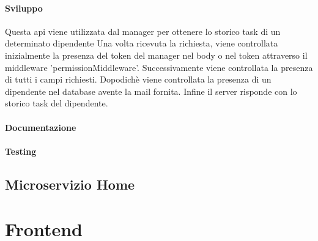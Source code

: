 \documentclass{report}
\begin{document}
		\subsubsection*{Sviluppo}
		Questa api viene utilizzata dal manager per ottenere lo storico task di un determinato dipendente
		Una volta ricevuta la richiesta, viene controllata inizialmente la presenza del token del manager nel body o nel token attraverso il middleware 'permissionMiddleware'.
		Successivamente viene controllata la presenza di tutti i campi richiesti.
		Dopodichè viene controllata la presenza di un dipendente nel database avente la mail fornita.
		Infine il server risponde con lo storico task del dipendente.
		\subsubsection*{Documentazione}

		\subsubsection*{Testing}

\section{Microservizio Home}

\chapter{Frontend}
\end{document}
